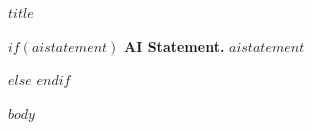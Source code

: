 \documentclass[12pt,letterpaper]{article}
\begin{document}
\thispagestyle{plain}
\begin{center}
{\fontsize{17}{22}\selectfont\bfseries $title$\par}
\end{center}
\vspace{8pt}
\begin{abstract}
\noindent $abstract$
\end{abstract}
$if(aistatement)$
\vspace{12pt}
\noindent\textbf{AI Statement.} $aistatement$\par
\clearpage
$else$
\vspace{10pt}
$endif$

$body$

\clearpage
\begingroup
\onehalfspacing
\setlength{\bibsep}{4pt}


\endgroup
\end{document}
